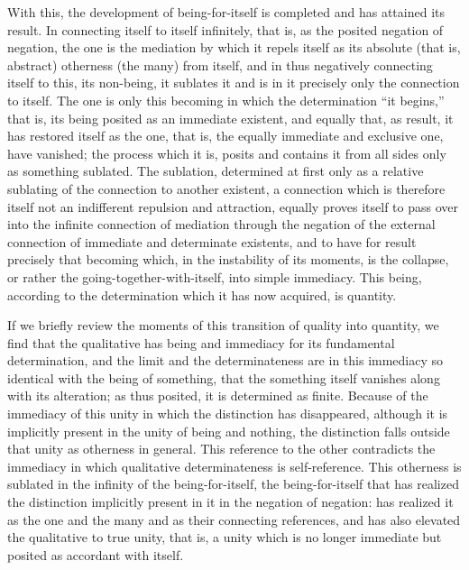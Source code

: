 With this, the development of being-for-itself
is completed and has attained its result.
In connecting itself to itself infinitely,
that is, as the posited negation of negation,
the one is the mediation by which it repels itself
as its absolute (that is, abstract) otherness (the many) from itself,
and in thus negatively connecting itself to this, its non-being,
it sublates it and is in it precisely only the connection to itself.
The one is only this becoming in which
the determination “it begins,” that is,
its being posited as an immediate existent,
and equally that, as result,
it has restored itself as the one,
that is, the equally immediate and exclusive one, have vanished;
the process which it is, posits and contains it
from all sides only as something sublated.
The sublation, determined at first only as a relative sublating of
the connection to another existent,
a connection which is therefore itself not
an indifferent repulsion and attraction,
equally proves itself to pass over into
the infinite connection of mediation
through the negation of the external
connection of immediate and determinate existents,
and to have for result precisely that becoming
which, in the instability of its moments, is the collapse,
or rather the going-together-with-itself, into simple immediacy.
This being, according to the determination
which it has now acquired, is quantity.

If we briefly review the moments
of this transition of quality into quantity,
we find that the qualitative has being and immediacy
for its fundamental determination,
and the limit and the determinateness are
in this immediacy so identical with the being of something,
that the something itself vanishes
along with its alteration;
as thus posited, it is determined as finite.
Because of the immediacy of this unity
in which the distinction has disappeared,
although it is implicitly present in
the unity of being and nothing,
the distinction falls outside
that unity as otherness in general.
This reference to the other contradicts the immediacy
in which qualitative determinateness is self-reference.
This otherness is sublated in
the infinity of the being-for-itself,
the being-for-itself that has realized
the distinction implicitly present in it
in the negation of negation:
has realized it as the one and the many
and as their connecting references,
and has also elevated the qualitative to true unity,
that is, a unity which is no longer immediate
but posited as accordant with itself.

